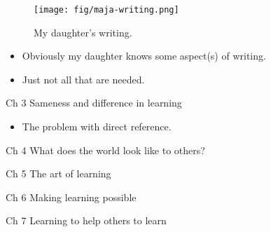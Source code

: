 \begin{frame}
  \begin{figure}
    \texttt{[image: fig/maja-writing.png]}
    \caption{My daughter's writing.}
  \end{figure}
  \begin{example}
    \begin{itemize}
      \item Obviously my daughter knows some aspect(s) of writing.
      \item Just not all that are needed.
    \end{itemize}
  \end{example}
\end{frame}

\begin{frame}
  \begin{block}{Ch 3 Sameness and difference in learning}
    \begin{itemize}
      \item The problem with direct reference.
    \end{itemize}
  \end{block}
\end{frame}

\begin{frame}
  \begin{block}{Ch 4 What does the world look like to others?}
  \end{block}
\end{frame}

\begin{frame}
  \begin{block}{Ch 5 The art of learning}
  \end{block}
\end{frame}

\begin{frame}
  \begin{block}{Ch 6 Making learning possible}
  \end{block}
\end{frame}

\begin{frame}
  \begin{block}{Ch 7 Learning to help others to learn}
  \end{block}
\end{frame}

